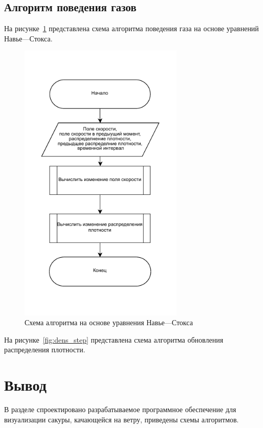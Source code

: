 \subsection{Алгоритм поведения газов}

На рисунке~\ref{fig:Navie-Stocks} представлена схема алгоритма поведения газа на основе уравнений Навье---Стокса. 
\begin{figure}[H]
	\centering
	\includegraphics[width=0.7\textwidth, page=1]{assets/img/Naive_stocks.pdf}   
	\caption{Схема алгоритма на основе уравнения Навье---Стокса}
	\label{fig:Navie-Stocks}
\end{figure}

На рисунке~\ref{fig:dens_step} представлена схема алгоритма обновления распределения плотности.

\section*{Вывод}
В разделе спроектировано разрабатываемое программное обеспечение для визуализации сакуры, качающейся на ветру, приведены схемы алгоритмов.

